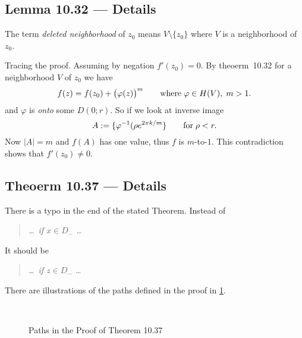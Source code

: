 \subsection{Lemma 10.32 --- Details}

The term
\emph{deleted neighborhood} of \(z_0\) means \(V\setminus\{z_0\}\)
where $V$ is a neighborhood of \(z_0\).

Tracing the proof. Assuming by negation \(f'(z_0) = 0\).
By theoerm~10.32 for a neighborhood $V$ of \(z_0\) we have
\begin{equation*}
f(z) = f(z_0) + \bigl(\varphi(z)\bigr)^m
\qquad \textnormal{where}\;\varphi\in H(V),\; m > 1.
\end{equation*}
and \(\varphi\) is \emph{onto} some \(D(0;r)\).
So if we look at inverse image
\begin{equation*}
A := \{\varphi^{-1}(\rho e^{2\pi k/m}\} \qquad \textnormal{for}\; \rho < r.
\end{equation*}
Now \(|A|=m\) and \(f(A)\) has one value, thus $f$ is $m$-to-$1$.
This contradiction shows that \(f'(z_0) \neq 0\).

\subsection{Theoerm 10.37 --- Details}

There is a typo in the end of the stated Theorem.
Instead of
\begin{quote}
\textsl{\ldots\ if \(x\in D_-\) \ldots}
\end{quote}
It should be
\begin{quote}
\textsl{\ldots\ if \(z\in D_-\) \ldots}
\end{quote}

There are illustrations of the paths defined in the proof 
in \figurename{\ref{fig:10-37}}.
\begin{figure}[ht]
%
%
\hspace{0.1\textwidth}
%
%
\\[20pt]%
%
%
\hspace{0.1\textwidth}
%
%
\caption{Paths in the Proof of Theorem 10.37}
\label{fig:10-37}
\end{figure}


